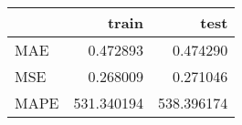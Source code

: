\begin{tabular}{lrr}
\toprule
{} &       train &        test \\
\midrule
MAE  &    0.472893 &    0.474290 \\
MSE  &    0.268009 &    0.271046 \\
MAPE &  531.340194 &  538.396174 \\
\bottomrule
\end{tabular}
